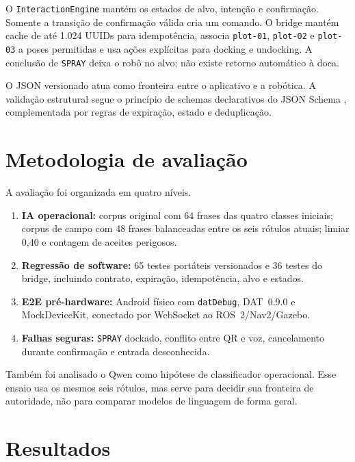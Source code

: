 \documentclass[conference]{IEEEtran}
\begin{document}
O \texttt{InteractionEngine} mantém os estados de alvo, intenção e confirmação. Somente a transição de confirmação válida cria um comando. O bridge mantém cache de até 1.024 UUIDs para idempotência, associa \texttt{plot-01}, \texttt{plot-02} e \texttt{plot-03} a poses permitidas e usa ações explícitas para docking e undocking. A conclusão de \texttt{SPRAY} deixa o robô no alvo; não existe retorno automático à doca.

O JSON versionado atua como fronteira entre o aplicativo e a robótica. A validação estrutural segue o princípio de schemas declarativos do JSON Schema \cite{jsonschema}, complementada por regras de expiração, estado e deduplicação.

\section{Metodologia de avaliação}

A avaliação foi organizada em quatro níveis.

\begin{enumerate}
  \item \textbf{IA operacional:} corpus original com 64 frases das quatro classes iniciais; corpus de campo com 48 frases balanceadas entre os seis rótulos atuais; limiar 0,40 e contagem de aceites perigosos.
  \item \textbf{Regressão de software:} 65 testes portáteis versionados e 36 testes do bridge, incluindo contrato, expiração, idempotência, alvo e estados.
  \item \textbf{E2E pré-hardware:} Android físico com \texttt{datDebug}, DAT~0.9.0 e MockDeviceKit, conectado por WebSocket ao ROS~2/Nav2/Gazebo.
  \item \textbf{Falhas seguras:} \texttt{SPRAY} dockado, conflito entre QR e voz, cancelamento durante confirmação e entrada desconhecida.
\end{enumerate}

Também foi analisado o Qwen como hipótese de classificador operacional. Esse ensaio usa os mesmos seis rótulos, mas serve para decidir sua fronteira de autoridade, não para comparar modelos de linguagem de forma geral.

\section{Resultados}
\end{document}
